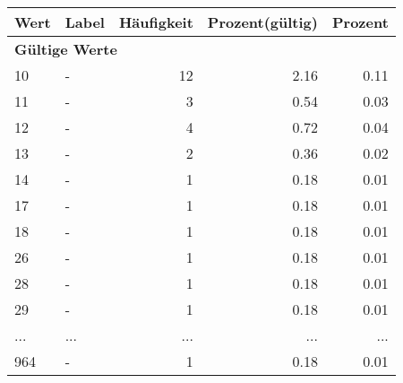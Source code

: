      \begin{longtable}{lXrrr}
     \toprule
     \textbf{Wert} & \textbf{Label} & \textbf{Häufigkeit} & \textbf{Prozent(gültig)} & \textbf{Prozent} \\
     \endhead
     \midrule
     \multicolumn{5}{l}{\textbf{Gültige Werte}}\\
        10 & \multicolumn{1}{X}{-} & %
          \num{12} &
          \num[round-mode=places,round-precision=2]{2.16} &
          \num[round-mode=places,round-precision=2]{0.11} \\
        11 & \multicolumn{1}{X}{-} & %
          \num{3} &
          \num[round-mode=places,round-precision=2]{0.54} &
          \num[round-mode=places,round-precision=2]{0.03} \\
        12 & \multicolumn{1}{X}{-} & %
          \num{4} &
          \num[round-mode=places,round-precision=2]{0.72} &
          \num[round-mode=places,round-precision=2]{0.04} \\
        13 & \multicolumn{1}{X}{-} & %
          \num{2} &
          \num[round-mode=places,round-precision=2]{0.36} &
          \num[round-mode=places,round-precision=2]{0.02} \\
        14 & \multicolumn{1}{X}{-} & %
          \num{1} &
          \num[round-mode=places,round-precision=2]{0.18} &
          \num[round-mode=places,round-precision=2]{0.01} \\
        17 & \multicolumn{1}{X}{-} & %
          \num{1} &
          \num[round-mode=places,round-precision=2]{0.18} &
          \num[round-mode=places,round-precision=2]{0.01} \\
        18 & \multicolumn{1}{X}{-} & %
          \num{1} &
          \num[round-mode=places,round-precision=2]{0.18} &
          \num[round-mode=places,round-precision=2]{0.01} \\
        26 & \multicolumn{1}{X}{-} & %
          \num{1} &
          \num[round-mode=places,round-precision=2]{0.18} &
          \num[round-mode=places,round-precision=2]{0.01} \\
        28 & \multicolumn{1}{X}{-} & %
          \num{1} &
          \num[round-mode=places,round-precision=2]{0.18} &
          \num[round-mode=places,round-precision=2]{0.01} \\
        29 & \multicolumn{1}{X}{-} & %
          \num{1} &
          \num[round-mode=places,round-precision=2]{0.18} &
          \num[round-mode=places,round-precision=2]{0.01} \\
       ... & ... & ... & ... & ... \\
        964 & \multicolumn{1}{X}{-} & %
          \num{1} &
          \num[round-mode=places,round-precision=2]{0.18} &
          \num[round-mode=places,round-precision=2]{0.01} \\


\end{longtable}

